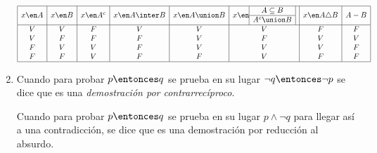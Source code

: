 \begin{enumerate}[label=(\alph*)]
        \[
          \begin{array}{|c|c|c|c|c|c|c|c|}
            \hline
            x \en A & x \en B & x \en A^c & x \en A \inter B & x \en A \union B & x \en \subconjuntoYequivalente & x \en A \triangle B & A - B \\
            \hline
            V       & V       & F         & V                & V                & V                              & F                   & F     \\
            V       & F       & F         & F                & V                & F                              & V                   & V     \\
            F       & V       & V         & F                & V                & V                              & V                   & F     \\
            F       & F       & V         & F                & F                & V                              & F                   & F     \\
            \hline
          \end{array}
        \]
  \item
        Cuando para probar $p \entonces q$ se prueba en su lugar $\neg q \entonces \neg p$ se dice que es
        una \textit{demostración
          por contrarrecíproco}.\par
        Cuando para probar $p \entonces q$ se prueba en su lugar $p \land \neg q$ para llegar así
        a una contradicción, se dice que es una demostración por reducción al absurdo.

\end{enumerate}
